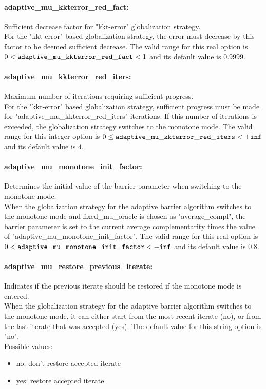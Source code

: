 \paragraph{adaptive\_mu\_kkterror\_red\_fact:}\label{sec:adaptive_mu_kkterror_red_fact} Sufficient decrease factor for "kkt-error" globalization strategy. $\;$ \\
 For the "kkt-error" based globalization strategy,
the error must decrease by this factor to be
deemed sufficient decrease. The valid range for this real option is 
$0 <  {\tt adaptive\_mu\_kkterror\_red\_fact } <  1$
and its default value is $0.9999$.


\paragraph{adaptive\_mu\_kkterror\_red\_iters:}\label{sec:adaptive_mu_kkterror_red_iters} Maximum number of iterations requiring sufficient progress. $\;$ \\
 For the "kkt-error" based globalization strategy,
sufficient progress must be made for
"adaptive\_mu\_kkterror\_red\_iters" iterations.
If this number of iterations is exceeded, the
globalization strategy switches to the monotone
mode. The valid range for this integer option is
$0 \le {\tt adaptive\_mu\_kkterror\_red\_iters } <  {\tt +inf}$
and its default value is $4$.


\paragraph{adaptive\_mu\_monotone\_init\_factor:}\label{sec:adaptive_mu_monotone_init_factor} Determines the initial value of the barrier parameter when switching to the monotone mode. $\;$ \\
 When the globalization strategy for the adaptive
barrier algorithm switches to the monotone mode
and fixed\_mu\_oracle is chosen as
"average\_compl", the barrier parameter is set to
the current average complementarity times the
value of "adaptive\_mu\_monotone\_init\_factor". The valid range for this real option is 
$0 <  {\tt adaptive\_mu\_monotone\_init\_factor } <  {\tt +inf}$
and its default value is $0.8$.


\paragraph{adaptive\_mu\_restore\_previous\_iterate:}\label{sec:adaptive_mu_restore_previous_iterate} Indicates if the previous iterate should be restored if the monotone mode is entered. $\;$ \\
 When the globalization strategy for the adaptive
barrier algorithm switches to the monotone mode,
it can either start from the most recent iterate
(no), or from the last iterate that was accepted
(yes).
The default value for this string option is "no".
\\ 
Possible values:
\begin{itemize}
   \item no: don't restore accepted iterate
   \item yes: restore accepted iterate
\end{itemize}

